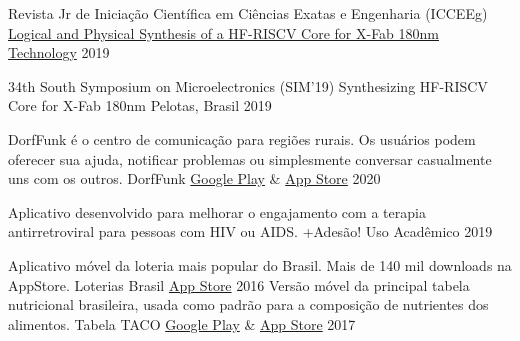
\begin{cventries}


    \cvcompactentry
    { Revista Jr de Iniciação Científica em Ciências Exatas e Engenharia (ICCEEg)}
    {\href{http://download.c3.furg.br/components/download_categoria/baixar.php?arquivo=e4873aa9a05cc5ed839561d121516766}{Logical and Physical Synthesis of a HF-RISCV Core for X-Fab 180nm Technology}}
    {}
    {2019}

  \cvcompactentry
    {34th South Symposium on Microelectronics (SIM'19)}
    {Synthesizing HF-RISCV Core for X-Fab 180nm}
    {Pelotas, Brasil}
    {2019}
\end{cventries}


\begin{cventries}

  \cvcompactentry
    {DorfFunk é o centro de comunicação para regiões rurais. Os usuários podem oferecer sua ajuda, notificar problemas ou simplesmente conversar casualmente uns com os outros.}
    {DorfFunk}
    {\href{https://play.google.com/store/apps/details?id=de.fhg.iese.dd.dorffunk.android&hl=pt_BR&gl=US}{Google Play} \& \href{https://apps.apple.com/app/id1348748008}{App Store} }
    {2020}

    \cvcompactentry
    {Aplicativo desenvolvido para melhorar o engajamento com a terapia antirretroviral para pessoas com HIV ou AIDS.}
    {+Adesão!}
    {Uso Acadêmico}
    {2019}

  \cvcompactentry
    {Aplicativo móvel da loteria mais popular do Brasil. Mais de 140 mil downloads na AppStore.}
    {Loterias Brasil}
    {\href{https://apps.apple.com/app/id992505562}{App Store}}
    {2016}
  \cvcompactentry
    {Versão móvel da principal tabela nutricional brasileira, usada como padrão para a composição de nutrientes dos alimentos.}
    {Tabela TACO}
    {\href{https://play.google.com/store/apps/details?id=rodrigo.TabelaTaco&hl=pt_BR&gl=US}{Google Play} \& \href{https://apps.apple.com/app/id1066079092}{App Store} }
    {2017}

\end{cventries}
